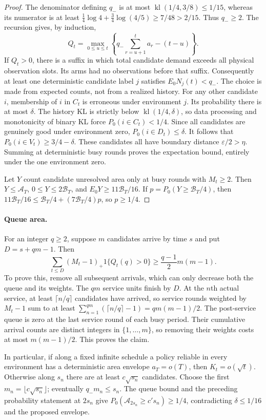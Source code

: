 \begin{proof}
The denominator defining $q_-$ is at most
$\operatorname{kl}(1/4,3/8)\le1/15$, whereas its numerator is at least
$\frac14\log4+\frac34\log(4/5)\ge7/48>2/15$. Thus $q_-\ge2$.
The recursion gives, by induction,
\[
 Q_t=\max_{0\le u\le t}\left\{
       q_-\sum_{r=u+1}^ta_r-(t-u)\right\}.
\]
If $Q_t>0$, there is a suffix in which total candidate demand exceeds all
physical observation slots. Its arms had no observations before that suffix.
Consequently at least one deterministic candidate label $j$ satisfies
$E_0N_j(t)<q_-$. The choice is made from expected counts, not from a realized
history. For any other candidate $i$, membership of $i$ in $C_t$ is erroneous
under environment $j$. Its probability there is at most $\delta$.
The history KL is strictly below $\operatorname{kl}(1/4,\delta)$, so data
processing and monotonicity of binary KL force $P_0(i\in C_t)<1/4$.
Since all candidates are genuinely good under environment zero,
$P_0(i\in D_t)\le\delta$. It follows that
$P_0(i\in V_t)\ge3/4-\delta$. These candidates all have boundary distance
$\varepsilon/2>\eta$. Summing at deterministic busy rounds proves the
expectation bound, entirely under the one environment zero.

Let $Y$ count candidate unresolved area only at busy rounds with $M_t\ge2$.
Then $Y\le\mathcal A_T$, $0\le Y\le2\mathcal B_T$, and
$E_0Y\ge11\mathcal B_T/16$. If
$p=P_0(Y\ge\mathcal B_T/4)$, then
$11\mathcal B_T/16\le\mathcal B_T/4+(7\mathcal B_T/4)p$, so $p\ge1/4$.
\end{proof}

\paragraph{Queue area.}
For an integer $q\ge2$, suppose $m$ candidates arrive by time $s$ and put
$D=s+qm-1$. Then
\[
 \sum_{t\le D}(M_t-1)_+1\{Q_t(q)>0\}
 \ge\frac{q-1}{2}m(m-1).
\]
To prove this, remove all subsequent arrivals, which can only decrease both
the queue and its weights. The $qm$ service units finish by $D$. At the
$n$th actual service, at least $\lceil n/q\rceil$ candidates have arrived,
so service rounds weighted by $M_t-1$ sum to at least
$\sum_{n=1}^{qm}(\lceil n/q\rceil-1)=qm(m-1)/2$.
The post-service queue is zero at the last service round of each busy period.
Their cumulative arrival counts are distinct integers in $\{1,\ldots,m\}$,
so removing their weights costs at most $m(m-1)/2$. This proves the claim.

In particular, if along a fixed infinite schedule a policy reliable in every
environment has a deterministic area envelope $a_T=o(T)$, then
$K_t=o(\sqrt t)$. Otherwise along $s_n$ there are at least $c\sqrt{s_n}$
candidates. Choose the first $m_n=\lfloor c\sqrt{s_n}\rfloor$; eventually
$q_-m_n\le s_n$. The queue bound and the preceding probability statement at
$2s_n$ give $P_0(\mathcal A_{2s_n}\ge c's_n)\ge1/4$, contradicting
$\delta\le1/16$ and the proposed envelope.

